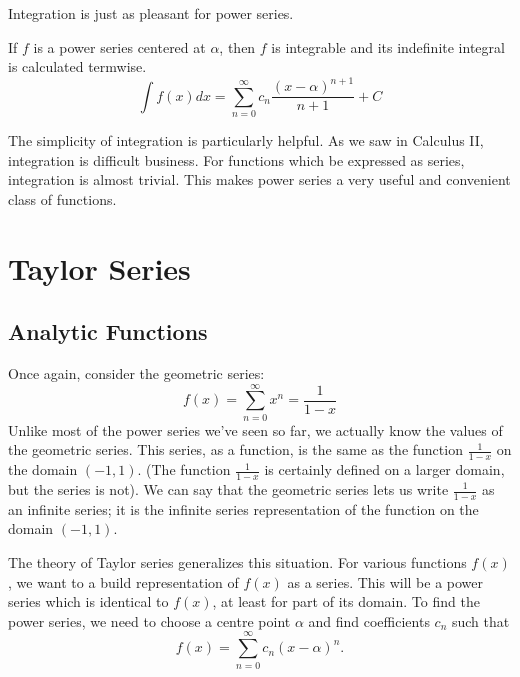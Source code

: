 \documentclass[fleqn]{report}
\begin{document}
Integration is just as pleasant for power series.

\begin{prop}
If $f$ is a power series centered at $\alpha$, then $f$ is
integrable and its indefinite integral is calculated termwise.
\begin{equation*}
\int f(x) dx= \sum_{n=0}^\infty c_n \frac{(x-\alpha)^{n+1}}{n+1} + C
\end{equation*}
\end{prop}

The simplicity of integration is particularly helpful. As we
saw in Calculus II, integration is difficult business. For
functions which be expressed as series, integration is almost
trivial. This makes power series a very useful and convenient
class of functions.

\section{Taylor Series}
\label{taylor-series}

\subsection{Analytic Functions}
\label{analytic-functions}

Once again, consider the geometric series:
\begin{equation*}
f(x) = \sum_{n=0}^\infty x^n = \frac{1}{1-x} 
\end{equation*}
Unlike most of the power series we've seen so far, we actually
know the values of the geometric series. This series, as a
function, is the same as the function $\frac{1}{1-x}$ on the
domain $(-1,1)$. (The function $\frac{1}{1-x}$ is certainly
defined on a larger domain, but the series is not). We can
say that the geometric series lets us write $\frac{1}{1-x}$ as
an infinite series; it is the infinite series representation
of the function on the domain $(-1,1)$. 

The theory of Taylor series generalizes this situation. For
various functions $f(x)$, we want to a build representation of
$f(x)$ as a series. This will be a power series which is identical to
$f(x)$, at least for part of its domain. To find the power
series, we need to choose a centre point $\alpha$ and find
coefficients $c_n$ such that
\begin{equation*}
f(x) = \sum_{n=0}^\infty c_n (x-\alpha)^n.
\end{equation*}
\end{document}
